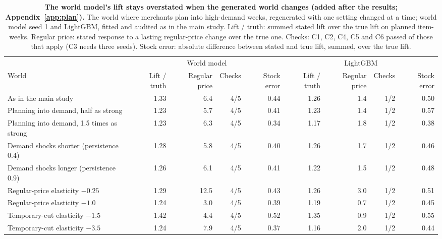 \begin{table}[t]
\centering
\caption{\textbf{The world model's lift stays overstated when the generated world changes (added after the results;
Appendix~\ref{app:plan}).} The world where merchants plan into high-demand weeks, regenerated with one
setting changed at a time; world model seed 1 and LightGBM, fitted and audited as in the main study. Lift / truth:
summed stated lift over the true lift on planned item-weeks. Regular price: stated response to a lasting
regular-price change over the true one. Checks: C1, C2, C4, C5 and C6 passed of those that apply (C3 needs three
seeds). Stock error: absolute difference between stated and true lift, summed, over the true lift.}
\label{tab:known-sens}
\footnotesize\setlength{\tabcolsep}{4pt}
\begin{adjustbox}{max width=\textwidth}
\begin{tabular}{lrrrrrrrr}
\toprule
 & \multicolumn{4}{c}{World model} & \multicolumn{4}{c}{LightGBM} \\
\cmidrule(lr){2-5}\cmidrule(lr){6-9}
World & Lift / truth & Regular price & Checks & Stock error & Lift / truth & Regular price & Checks & Stock error \\
\midrule
As in the main study & 1.33 & 6.4 & 4/5 & 0.44 & 1.26 & 1.4 & 1/2 & 0.50 \\
Planning into demand, half as strong & 1.23 & 5.7 & 4/5 & 0.41 & 1.23 & 1.4 & 1/2 & 0.57 \\
Planning into demand, 1.5 times as strong & 1.23 & 6.3 & 4/5 & 0.34 & 1.17 & 1.8 & 1/2 & 0.38 \\
Demand shocks shorter (persistence 0.4) & 1.28 & 5.8 & 4/5 & 0.40 & 1.26 & 1.7 & 1/2 & 0.46 \\
Demand shocks longer (persistence 0.9) & 1.26 & 6.1 & 4/5 & 0.41 & 1.22 & 1.5 & 1/2 & 0.48 \\
Regular-price elasticity $-0.25$ & 1.29 & 12.5 & 4/5 & 0.43 & 1.26 & 3.0 & 1/2 & 0.51 \\
Regular-price elasticity $-1.0$ & 1.24 & 3.0 & 4/5 & 0.39 & 1.19 & 0.7 & 1/2 & 0.45 \\
Temporary-cut elasticity $-1.5$ & 1.42 & 4.4 & 4/5 & 0.52 & 1.35 & 0.9 & 1/2 & 0.55 \\
Temporary-cut elasticity $-3.5$ & 1.24 & 7.9 & 4/5 & 0.37 & 1.16 & 2.0 & 1/2 & 0.44 \\
\bottomrule
\end{tabular}
\end{adjustbox}
\end{table}
